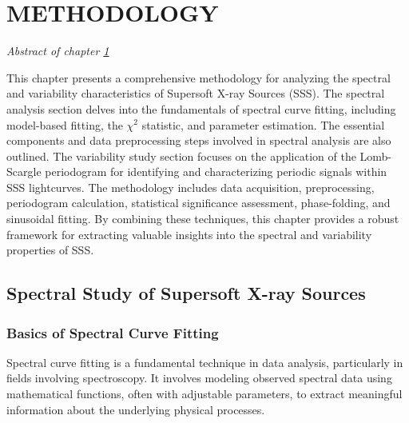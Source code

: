 \chapter{METHODOLOGY} \label{chap:methodology}
    \minitoc
    
    \newpage
    \begin{center}
    	\emph{Abstract of chapter \ref{chap:methodology}}
    \end{center}
    
    This chapter presents a comprehensive methodology for analyzing the spectral and variability characteristics of Supersoft X-ray Sources (SSS). The spectral analysis section delves into the fundamentals of spectral curve fitting, including model-based fitting, the $\chi^2$ statistic, and parameter estimation. The essential components and data preprocessing steps involved in spectral analysis are also outlined. The variability study section focuses on the application of the Lomb-Scargle periodogram for identifying and characterizing periodic signals within SSS lightcurves. The methodology includes data acquisition, preprocessing, periodogram calculation, statistical significance assessment, phase-folding, and sinusoidal fitting. By combining these techniques, this chapter provides a robust framework for extracting valuable insights into the spectral and variability properties of SSS.
    
    \newpage
    \section{Spectral Study of Supersoft X-ray Sources} \label{methodology:spectral}
    	
    	\subsection{Basics of Spectral Curve Fitting}
    		Spectral curve fitting is a fundamental technique in data analysis, particularly in fields involving spectroscopy. It involves modeling observed spectral data using mathematical functions, often with adjustable parameters, to extract meaningful information about the underlying physical processes.

